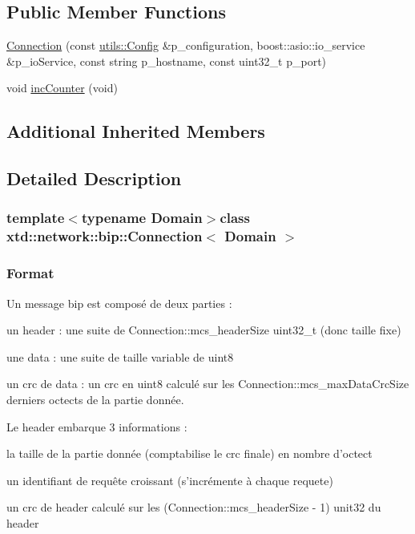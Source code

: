\subsection*{Public Member Functions}
\begin{DoxyCompactItemize}
\item 
\hyperlink{classxtd_1_1network_1_1bip_1_1Connection_a5c981bbe6f8f26ac8eb25f70b2427d5c}{Connection} (const \hyperlink{classxtd_1_1network_1_1utils_1_1Config}{utils\-::\-Config} \&p\-\_\-configuration, boost\-::asio\-::io\-\_\-service \&p\-\_\-io\-Service, const string p\-\_\-hostname, const uint32\-\_\-t p\-\_\-port)
\item 
void \hyperlink{classxtd_1_1network_1_1bip_1_1Connection_acac00964a4fc76de35cdb516e9d73051}{inc\-Counter} (void)
\end{DoxyCompactItemize}
\subsection*{Additional Inherited Members}


\subsection{Detailed Description}
\subsubsection*{template$<$typename Domain$>$class xtd\-::network\-::bip\-::\-Connection$<$ Domain $>$}

\subsubsection*{Format }

Un message bip est composé de deux parties \-:
\begin{DoxyItemize}
\item un header \-: une suite de Connection\-::mcs\-\_\-header\-Size uint32\-\_\-t (donc taille fixe)
\item une data \-: une suite de taille variable de uint8
\item un crc de data \-: un crc en uint8 calculé sur les Connection\-::mcs\-\_\-max\-Data\-Crc\-Size derniers octects de la partie donnée.
\end{DoxyItemize}

Le header embarque 3 informations \-:
\begin{DoxyItemize}
\item la taille de la partie donnée (comptabilise le crc finale) en nombre d'octect
\item un identifiant de requête croissant (s'incrémente à chaque requete)
\item un crc de header calculé sur les (Connection\-::mcs\-\_\-header\-Size -\/ 1) unit32 du header
\end{DoxyItemize}

